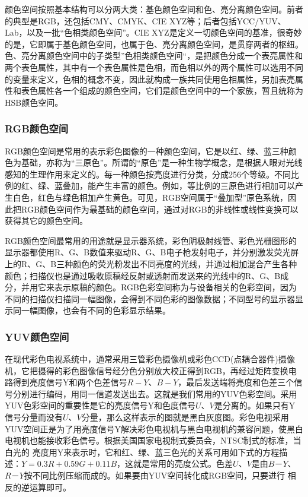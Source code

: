 \documentclass[12pt]{article}
\begin{document}
颜色空间按照基本结构可以分两大类：基色颜色空间和色、亮分离颜色空间。前者的典型是RGB，还包括CMY、CMYK、CIE XYZ等；后者包括YCC/YUV、Lab，以及一批“色相类颜色空间”。CIE XYZ是定义一切颜色空间的基准，很奇妙的是，它即属于基色颜色空间，也属于色、亮分离颜色空间，是贯穿两者的枢纽。色、亮分离颜色空间中的子类型”色相类颜色空间“，是把颜色分成一个表亮属性和两个表色属性，其中有一个表色属性是色相，而色相以外的两个属性可以选用不同的变量来定义，色相的概念不变，因此就构成一族共同使用色相属性，另加表亮属性和表色属性各一个组成的颜色空间，它们是颜色空间中的一个家族，暂且统称为HSB颜色空间。

\subsubsection{RGB颜色空间}

RGB颜色空间是常用的表示彩色图像的一种颜色空间，它是以红、绿、蓝三种颜色为基础，亦称为“三原色”。所谓的“原色”是一种生物学概念，是根据人眼对光线感知的生理作用来定义的。每一种颜色按亮度进行分类，分成256个等级。不同比例的红、绿、蓝叠加，能产生丰富的颜色。例如，等比例的三原色进行相加可以产生白色，红色与绿色相加产生黄色。可见，RGB空间属于“叠加型”原色系统，因此把RGB颜色空间作为最基础的颜色空间，通过对RGB的非线性或线性变换可以获得其它的颜色空间。

RGB颜色空间最常用的用途就是显示器系统，彩色阴极射线管、彩色光栅图形的显示器都使用R、G、B数值来驱动R、G、B电子枪发射电子，并分别激发荧光屏上的R、G、B三种颜色的荧光粉发出不同亮度的光线，并通过相加混合产生各种颜色；扫描仪也是通过吸收原稿经反射或透射而发送来的光线中的R、G、B成分，并用它来表示原稿的颜色。RGB色彩空间称为与设备相关的色彩空间，因为不同的扫描仪扫描同一幅图像，会得到不同色彩的图像数据；不同型号的显示器显示同一幅图像，也会有不同的色彩显示结果。

\subsubsection{YUV颜色空间}

在现代彩色电视系统中，通常采用三管彩色摄像机或彩色CCD(点耦合器件)摄像机，它把摄得的彩色图像信号经分色分别放大校正得到RGB，再经过矩阵变换电路得到亮度信号Y和两个色差信号$R-Y$、$B-Y$，最后发送端将亮度和色差三个信号分别进行编码，用同一信道发送出去。这就是我们常用的YUV色彩空间。采用YUV色彩空间的重要性是它的亮度信号Y和色度信号$U$、$V$是分离的。如果只有Y信号分量而没有$U$、$V$分量，那么这样表示的图就是黑白灰度图。彩色电视采用YUV空间正是为了用亮度信号Y解决彩色电视机与黑白电视机的兼容问题，使黑白电视机也能接收彩色信号。根据美国国家电视制式委员会，NTSC制式的标准，当白光的 亮度用Y来表示时，它和红、绿、蓝三色光的关系可用如下式的方程描述：$Y=0.3R+0.59G+0.11B$，这就是常用的亮度公式。色差$U$、$V$是由$B－Y$、$R－Y$按不同比例压缩而成的。如果要由YUV空间转化成RGB空间，只要进行 相反的逆运算即可。
\end{document}
